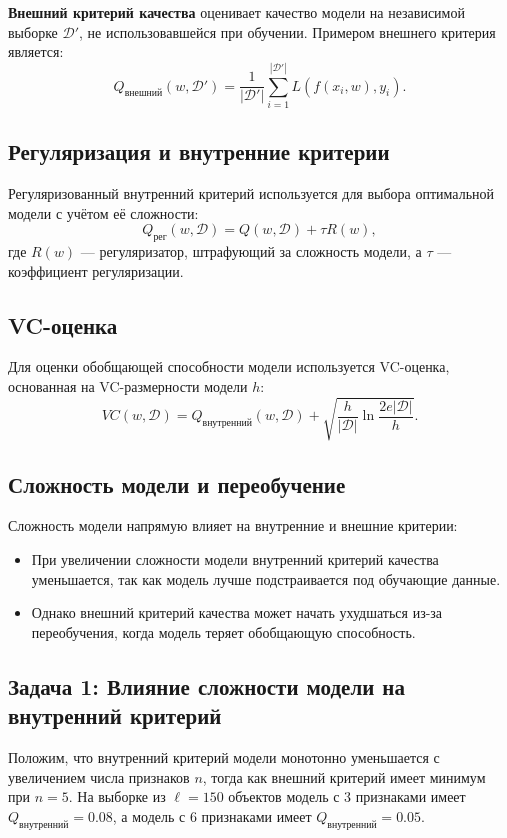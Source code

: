 \textbf{Внешний критерий качества} оценивает качество модели на независимой выборке $\mathcal{D}'$, не использовавшейся при обучении. Примером внешнего критерия является:
\[
    Q_{\text{внешний}}(w, \mathcal{D}') = \frac{1}{|\mathcal{D}'|} \sum_{i=1}^{|\mathcal{D}'|} L(f(x_i, w), y_i).
\]

\subsection*{Регуляризация и внутренние критерии}
Регуляризованный внутренний критерий используется для выбора оптимальной модели с учётом её сложности:
\[
    Q_{\text{рег}}(w, \mathcal{D}) = Q(w, \mathcal{D}) + \tau R(w),
\]
где $R(w)$ --- регуляризатор, штрафующий за сложность модели, а $\tau$ --- коэффициент регуляризации.

\subsection*{VC-оценка}
Для оценки обобщающей способности модели используется VC-оценка, основанная на VC-размерности модели $h$:
\[
    VC(w, \mathcal{D}) = Q_{\text{внутренний}}(w, \mathcal{D}) + \sqrt{\frac{h}{|\mathcal{D}|} \ln \frac{2e|\mathcal{D}|}{h}}.
\]

\subsection*{Сложность модели и переобучение}
Сложность модели напрямую влияет на внутренние и внешние критерии:
\begin{itemize}
    \item При увеличении сложности модели внутренний критерий качества уменьшается, так как модель лучше подстраивается под обучающие данные.
    \item Однако внешний критерий качества может начать ухудшаться из-за переобучения, когда модель теряет обобщающую способность.
\end{itemize}

\subsection*{Задача 1: Влияние сложности модели на внутренний критерий}

Положим, что внутренний критерий модели монотонно уменьшается с увеличением числа признаков $n$, тогда как внешний критерий имеет минимум при $n = 5$. На выборке из $\ell = 150$ объектов модель с 3 признаками имеет $Q_{\text{внутренний}} = 0.08$, а модель с 6 признаками имеет $Q_{\text{внутренний}} = 0.05$.

